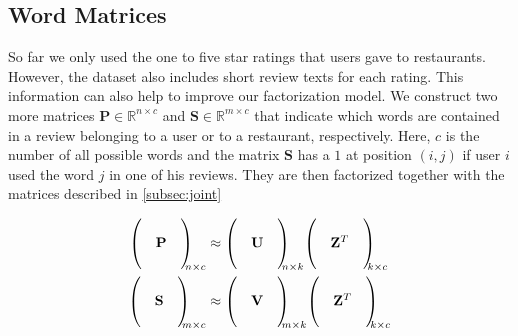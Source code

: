 \documentclass[a4paper]{article}
\begin{document}
\subsection{Word Matrices}
So far we only used the one to five star ratings that users gave to restaurants. However, the dataset also includes short review texts for each rating. This information can also help to improve our factorization model. We construct two more matrices $\mathbf{P} \in \mathbb{R}^{n \times c}$ and $\mathbf{S} \in \mathbb{R}^{m \times c}$ that indicate which words are contained in a review belonging to a user or to a restaurant, respectively. Here, $c$ is the number of all possible words and the matrix $\mathbf{S}$ has a $1$ at position $(i,j)$ if user $i$ used the word $j$ in one of his reviews. They are then factorized together with the matrices described in \ref{subsec:joint}

\begin{align}
{\begin{pmatrix}
  &    & \\
  & \mathbf{P} &\\
  &     &
\end{pmatrix}
\mkern-10mu}_{n \times c} &\approx
{\begin{pmatrix}
  &    & \\
  & \mathbf{U} &\\
  &     &
\end{pmatrix}
\mkern-10mu}_{n \times k}
{\begin{pmatrix}
  &    & \\
  & \mathbf{Z}^T &\\
  &     &
\end{pmatrix}\mkern-10mu}_{k \times c}  \\
{\begin{pmatrix}
  &    & \\
  & \mathbf{S} &\\
  &     &
\end{pmatrix}
\mkern-10mu}_{m \times c} &\approx
{\begin{pmatrix}
  &    & \\
  & \mathbf{V} &\\
  &     &
\end{pmatrix}
\mkern-10mu}_{m \times k}
{\begin{pmatrix}
  &    & \\
  & \mathbf{Z}^T &\\
  &     &
\end{pmatrix}\mkern-10mu}_{k \times c}
\end{align}
\end{document}
